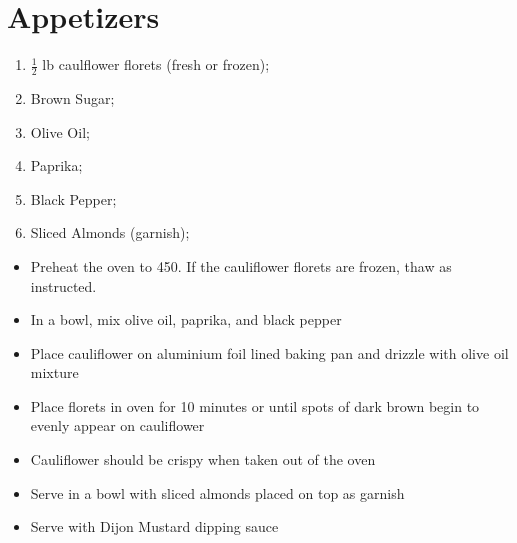 \documentclass[oneside]{recipe}
\newcommand{\recipecolumn}[2]{
	\begin{multicols}{2}
	\raggedcolumns
	#1
	\columnbreak
	#2
	\end{multicols}
}
\begin{document}
\chapter{Appetizers}
\recipecolumn{
	\begin{enumerate}
		\item $\frac{1}{2}$ lb caulflower florets (fresh or frozen);
		\item Brown Sugar;
		\item Olive Oil;
		\item Paprika;
		\item Black Pepper;
		\item Sliced Almonds (garnish);
	\end{enumerate}
}{
	\begin{itemize}
		\item Preheat the oven to 450. If the cauliflower florets are frozen, thaw as instructed.
		\item In a bowl, mix olive oil, paprika, and black pepper
		\item Place cauliflower on aluminium foil lined baking pan and drizzle with olive oil mixture
		\item Place florets in oven for 10 minutes or until spots of dark brown begin to evenly appear on cauliflower
		\item Cauliflower should be crispy when taken out of the oven
		\item Serve in a bowl with sliced almonds placed on top as garnish
		\item Serve with Dijon Mustard dipping sauce
	\end{itemize}
}
\newpage
{}
\end{document}
